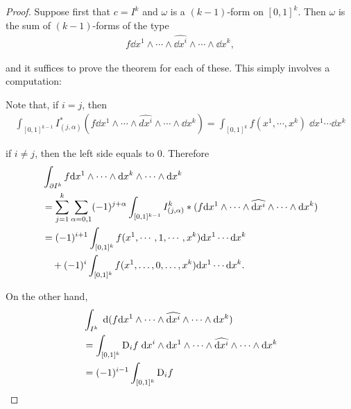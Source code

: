 \begin{proof}
    Suppose first that $c = I^k$ and $\omega$ is a $(k-1)$-form on $[0,1]^k$.
    Then $\omega$ is the sum of $(k-1)$-forms of the type
    \begin{align*}
        f\dd x^1\wedge\cdots\wedge\widehat{\dd x^i}\wedge\cdots\wedge \dd x^k,
    \end{align*}

    and it suffices to prove the theorem for each of these. This simply involves a 
    computation:

    Note that, if $i=j$, then
    \begin{align*}
        \int_{[0,1]^{k-1}}I_{(j,{\alpha})}^{*}(f\dd x^1\wedge\cdots\wedge\widehat{dx^i}\wedge\cdots\wedge \dd x^k) 
        = \int_{[0,1]^k} f(x^1,\cdots,x^k)\;\dd x^1\cdots\dd x^k
    \end{align*}

    if $i\neq j$, then the left side equals to 0. Therefore 
    \begin{align*}
        & \int_{\partial I^k} f\mathrm{d} x^1\wedge\cdots\wedge \mathrm{d} x^k\wedge\cdots\wedge\mathrm{d} x^k \\
        & = \sum_{j=1}^{k}\sum_{\alpha=0,1}(-1)^{j+\alpha}\int_{[0,1]^{k-1}}I_{(j,\alpha)}^{k}*(f\mathrm{d} x^1\wedge\cdots\wedge\widehat{\mathrm{d} x^i}\wedge\cdots\wedge\mathrm{d} x^k) \\
        & = (-1)^{i+1}\int_{[0,1]^k}f(x^1,\cdots, 1, \cdots,x^k)\mathrm{d} x^1\cdots \mathrm{d} x^k \\
        & \hspace*{1em} +(-1)^i\int_{[0,1]^k}f(x^1,\ldots,0,\ldots,x^k)\mathrm{d} x^1\cdots \mathrm{d} x^k.
    \end{align*}

    On the other hand,
    \begin{align*}
        & \int_{I^{k}}\;\mathrm{d}(f \mathrm{d} x^1\wedge\cdots\wedge\widehat{\mathrm{d} x^i}\wedge\cdots\wedge \mathrm{d} x^k) \\
        & = \int_{[0,1]^k}\mathrm{D}_i f\;\mathrm{d} x^i\wedge\mathrm{d} x^1\wedge\cdots\wedge\widehat{\mathrm{d} x^i}\wedge\cdots\wedge\mathrm{d} x^k \\
        & = (-1)^{i-1}\int_{[0,1]^k} {\mathrm{D}_i f}
    \end{align*}


\end{proof}

